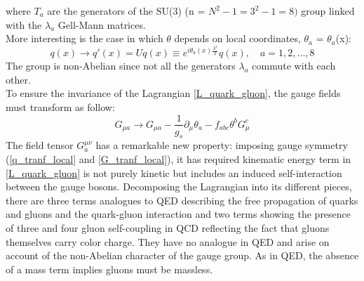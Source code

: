 where $T_{a}$ are the generators of the SU(3) (n = $N^{2} - 1 = 3^{2} - 1 = 8)$ group linked with the $\lambda_{a}$ Gell-Mann matrices. \\
More interesting is the case in which $\theta$ depends on local coordinates, $\theta_{a}$ = $\theta_{a}$(x):
\begin{equation}
q(x) \to q'(x) = Uq(x) \equiv e^{i\theta_{a}(x)\frac{\lambda^{a}}{2}}q(x), \quad a = 1, 2, ...,8
\label{q_tranf_local}
\end{equation}
The group is non-Abelian since not all the generators $\lambda_{a}$ commute with each other. \\
To ensure the invariance of the Lagrangian \ref{L_quark_gluon}, the gauge fields must transform as follow:
\begin{equation}
G_{\mu a} \to G_{\mu a} - \frac{1}{g_{s}} \partial_{\mu}\theta_{a} - f_{abc}\theta^{b}G^{c}_{\mu}
\label{G_tranf_local}
\end{equation}
The field tensor $G^{\mu\nu}_{a}$ has a remarkable new property: imposing gauge symmetry (\ref{q_tranf_local} and \ref{G_tranf_local}), it has required kinematic energy term in \ref{L_quark_gluon} is not purely kinetic but includes an induced self-interaction between the gauge bosons. Decomposing the Lagrangian into its different pieces, there are three terms analogues to QED describing the free propagation of quarks and gluons and the quark-gluon interaction and two terms showing the presence of three and four gluon self-coupling in QCD reflecting the fact that gluons themselves carry color charge. They have no analogue in QED and arise on account of the non-Abelian character of the gauge group. As in QED, the absence of a mass term implies gluons must be massless.\\

